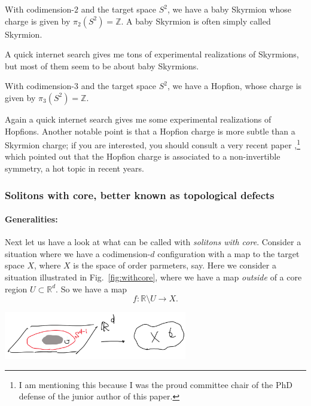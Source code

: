 \documentclass[12pt]{article}
\numberwithin{equation}{section}
\numberwithin{figure}{section}
\theoremstyle{remark}
\renewenvironment{figure}[1][]{
  \begin{originalfigure}[#1]
    \begin{mdframed}[linecolor=black!0,backgroundcolor=black!1]
}{
    \end{mdframed}
  \end{originalfigure}
}
\def\bR{\mathbb{R}}
\def\bZ{\mathbb{Z}}
\begin{document}
\begin{example}
With codimension-$2$ and the target space $S^2$, we have a baby Skyrmion whose charge is given by $\pi_2(S^2)=\bZ$.
A baby Skyrmion is often simply called  Skyrmion.
\end{example}

A quick internet search gives me tons of experimental realizations of Skyrmions, 
but most of them seem to be about baby Skyrmions. 

\begin{example}
With codimension-$3$ and the target space $S^2$, we have a Hopfion, whose charge is given by $\pi_3(S^2)=\bZ$.
\end{example}

Again a quick internet search gives me some experimental realizations of Hopfions.
Another notable point is that a Hopfion charge is more subtle than a Skyrmion charge;
if you are interested, you should consult a very recent paper \cite{Chen:2022cyw},\footnote{%
I am mentioning this because I was the proud committee chair of the PhD defense of the junior author of this paper.
}
which pointed out that the Hopfion charge is associated to a non-invertible symmetry,
a hot topic in recent years.


\subsubsection{Solitons with core, better known as topological defects}

\paragraph{Generalities:}
Next let us have a look at what can be called with \emph{solitons with core}.
Consider a situation where we have a codimension-$d$ configuration
with a map to the target space $X$, where $X$ is the space of order parmeters, say.
Here we consider a situation illustrated in Fig.~\ref{fig:withcore},
where we have a map \emph{outside} of a core region $U\subset \bR^d$.
So we have a map \begin{equation}
f: \bR\setminus  U \to X.
\end{equation}

\begin{figure}[h]
\centering
  \includegraphics[width=0.6\textwidth]{withcore.png}
  \caption{A codimension-$d$ configuration with `core', given by a map $S^{d-1}\to X$. }
  \label{fig:withcore}
\end{figure}
\end{document}

